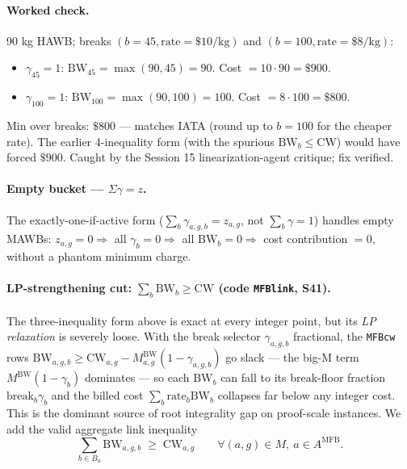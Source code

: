 \documentclass[11pt,a4paper]{article}
\theoremstyle{definition}
\begin{document}
\paragraph{Worked check.}
90 kg HAWB; breaks $(b = 45, \text{rate} = \$10/\text{kg})$ and
$(b = 100, \text{rate} = \$8/\text{kg})$:
\begin{itemize}[noitemsep]
  \item $\gamma_{45} = 1$: $\text{BW}_{45} = \max(90, 45) = 90$. Cost $= 10 \cdot 90 = \$900$.
  \item $\gamma_{100} = 1$: $\text{BW}_{100} = \max(90, 100) = 100$. Cost $= 8 \cdot 100 = \$800$.
\end{itemize}
Min over breaks: $\$800$ --- matches IATA (round up to $b = 100$ for the
cheaper rate). The earlier 4-inequality form (with the spurious $\text{BW}_b
\leq \text{CW}$) would have forced $\$900$. Caught by the Session 15
linearization-agent critique; fix verified.

\paragraph{Empty bucket --- $\Sigma \gamma = z$.}
The exactly-one-if-active form ($\sum_b \gamma_{a,g,b} = z_{a,g}$, not
$\sum_b \gamma = 1$) handles empty MAWBs: $z_{a,g} = 0 \Rightarrow$ all
$\gamma_b = 0 \Rightarrow$ all $\text{BW}_b = 0 \Rightarrow$ cost contribution
$= 0$, without a phantom minimum charge.

\paragraph{LP-strengthening cut: $\sum_b \text{BW}_b \geq \text{CW}$ (code \texttt{MFBlink}, S41).}
The three-inequality form above is exact at every integer point, but its
\emph{LP relaxation} is severely loose. With the break selector
$\gamma_{a,g,b}$ fractional, the \texttt{MFBcw} rows $\text{BW}_{a,g,b} \geq
\text{CW}_{a,g} - M^{\text{BW}}_{a,g}(1 - \gamma_{a,g,b})$ go slack --- the
big-M term $M^{\text{BW}}(1-\gamma_b)$ dominates --- so each $\text{BW}_b$ can
fall to its break-floor fraction $\text{break}_b \gamma_b$ and the billed cost
$\sum_b \text{rate}_b \text{BW}_b$ collapses far below any integer cost. This is
the dominant source of root integrality gap on proof-scale instances. We add
the valid aggregate link inequality
\begin{equation}
  \sum_{b \in B_a} \text{BW}_{a,g,b} \;\geq\; \text{CW}_{a,g}
  \qquad \forall (a, g) \in M,\ a \in A^{\text{MFB}}.
  \label{eq:mfb-link}
\end{equation}
\end{document}
